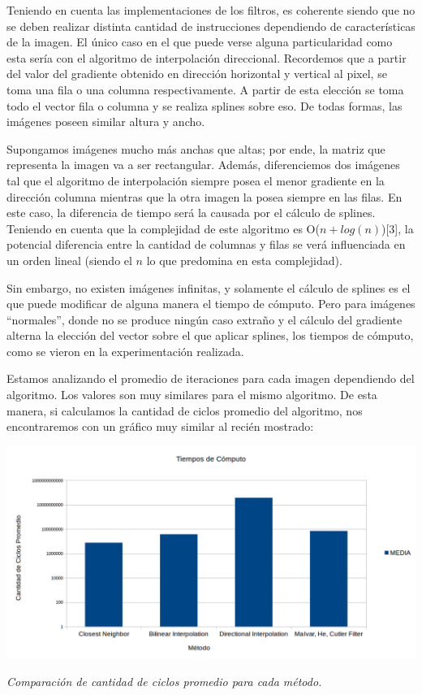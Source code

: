 \begin{itemize}
Teniendo en cuenta las implementaciones de los filtros, es coherente siendo que no se deben realizar distinta cantidad de instrucciones dependiendo de características de la imagen. El único caso en el que puede verse alguna particularidad como esta sería con el algoritmo de interpolación direccional. Recordemos que a partir del valor del gradiente obtenido en dirección horizontal y vertical al pixel, se toma una fila o una columna respectivamente. A partir de esta elección se toma todo el vector fila o columna y se realiza splines sobre eso. De todas formas, las imágenes poseen similar altura y ancho.

Supongamos imágenes mucho más anchas que altas; por ende, la matriz que representa la imagen va a ser rectangular. Además, diferenciemos dos imágenes tal que el algoritmo de interpolación siempre posea el menor gradiente en la dirección columna mientras que la otra imagen la posea siempre en las filas. En este caso, la diferencia de tiempo será la causada por el cálculo de splines. Teniendo en cuenta que la complejidad de este algoritmo es O($n + log(n)$)[3], la potencial diferencia entre la cantidad de columnas y filas se verá influenciada en un orden lineal (siendo el $n$ lo que predomina en esta complejidad).

Sin embargo, no existen imágenes infinitas, y solamente el cálculo de splines es el que puede modificar de alguna manera el tiempo de cómputo. Pero para imágenes ``normales'', donde no se produce ningún caso extraño y el cálculo del gradiente alterna la elección del vector sobre el que aplicar splines, los tiempos de cómputo, como se vieron en la experimentación realizada.


\vspace{\baselineskip}

Estamos analizando el promedio de iteraciones para cada imagen dependiendo del algoritmo. Los valores son muy similares para el mismo algoritmo. De esta manera, si calculamos la cantidad de ciclos promedio del algoritmo, nos encontraremos con un gráfico muy similar al recién mostrado:

	\begin{center}
		\includegraphics[scale=0.4]{./img/tiemposDeComputo.png}
		\vspace{2pt}
		\par
		\footnotesize\textit{Comparación de cantidad de ciclos promedio para cada método.}
	\end{center}


\end{itemize}
